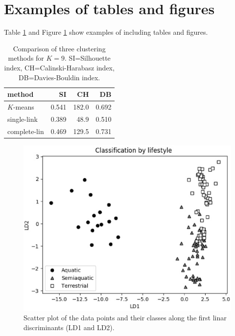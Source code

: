 \documentclass[a4paper,12pt]{article}
\begin{document}
\section{Examples of tables and figures}

Table \ref{tab1a} and Figure \ref{figLDplot} show examples of including tables and figures.

\begin{table}[!h]
  \begin{center}
    \caption{Comparison of three clustering methods for $K=9$. SI=Silhouette index, CH=Calinski-Harabasz index, DB=Davies-Bouldin index.}
    \label{tab1a}
    \begin{tabular}{|l|r|r|r|}
      \hline
      method       & SI    & CH    & DB    \\
      \hline
      $K$-means    & 0.541 & 182.0 & 0.692 \\
      single-link  & 0.389 & 48.9  & 0.510 \\
      complete-lin & 0.469 & 129.5 & 0.731 \\
      \hline
    \end{tabular}
  \end{center}
\end{table}


\begin{figure}[!h]
  \includegraphics[width=\textwidth]{exLDplot.eps}
  \caption{Scatter plot of the data points and their classes along the first linar discriminants (LD1 and LD2).}
  \label{figLDplot}
\end{figure}
\end{document}
